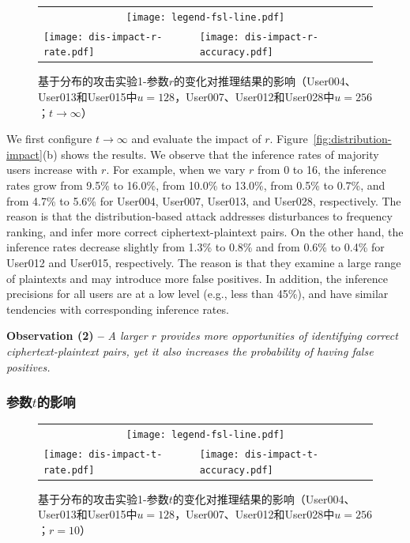 \begin{figure}[!htbp]
    \centering
    \begin{tabular}{p{.48\linewidth}p{.48\linewidth}}
        \multicolumn{2}{c}{\texttt{[image: legend-fsl-line.pdf]}}  \\
        \texttt{[image: dis-impact-r-rate.pdf]} &
        \texttt{[image: dis-impact-r-accuracy.pdf]}\\
    \end{tabular}
    \caption{基于分布的攻击实验1-参数$r$的变化对推理结果的影响（User004、User013和User015中$u = 128$，User007、User012和User028中$u = 256$；$t \rightarrow \infty$）}
    \label{fig:distribution-impact-r}
\end{figure}

We first configure $t \rightarrow \infty$ and evaluate the impact of $r$. Figure~\ref{fig:distribution-impact}(b) shows the results. We observe that the inference rates of majority users increase with $r$. For example, when we vary $r$ from 0 to 16, the inference rates grow from 9.5\% to 16.0\%, from 10.0\% to 13.0\%, from 0.5\% to 0.7\%, and from 4.7\% to 5.6\% for User004, User007, User013, and User028, respectively. The reason is that the distribution-based attack addresses disturbances to frequency ranking, and infer more correct ciphertext-plaintext  pairs. On the other hand, the inference rates decrease slightly from 1.3\% to 0.8\% and from 0.6\% to 0.4\% for User012 and User015, respectively. The reason is that they examine a large range of plaintexts and may introduce more false positives. In addition, the inference precisions for all users are  at a low level (e.g., less than 45\%), and have similar tendencies with corresponding inference rates.  

{\bf Observation (2) --} {\em A larger $r$ provides more opportunities of identifying correct ciphertext-plaintext pairs, yet it also increases the probability of having false positives.}   

\subsubsection{参数$t$的影响}

\begin{figure}[!ht]
    \centering
    \begin{tabular}{p{.48\linewidth}p{.48\linewidth}}
        \multicolumn{2}{c}{\texttt{[image: legend-fsl-line.pdf]}}  \\
        \texttt{[image: dis-impact-t-rate.pdf]} &
        \texttt{[image: dis-impact-t-accuracy.pdf]}\\
    \end{tabular}
    \caption{基于分布的攻击实验1-参数$t$的变化对推理结果的影响（User004、User013和User015中$u = 128$，User007、User012和User028中$u = 256$；$r = 10$）}
    \label{fig:distribution-impact-t}
\end{figure}

